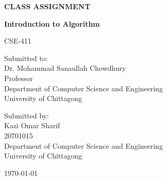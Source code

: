 \documentclass[11pt]{article}
\begin{document}
\begin{titlepage}
 \centering 
 { \bfseries \Large CLASS ASSIGNMENT \\}
    \vspace*{.7cm} 
  {  \textbf{Introduction to Algorithm}\par}
  {{CSE-411} \\}
   
   \vspace*{3cm} 
   Submitted to:\\
Dr. Mohammad Sanaullah Chowdhury\\
 Professor\\
Department of Computer Science and Engineering\\
University of Chittagong\\

\vspace*{3cm}  

Submitted by:\\
Kazi Omar Sharif\\
20701015\\
Department of Computer Science and Engineering\\
University of Chittagong\\

   {
   \vspace*{3cm} 
  \today

 
 
}

 


\end{titlepage} 
\end{document}

